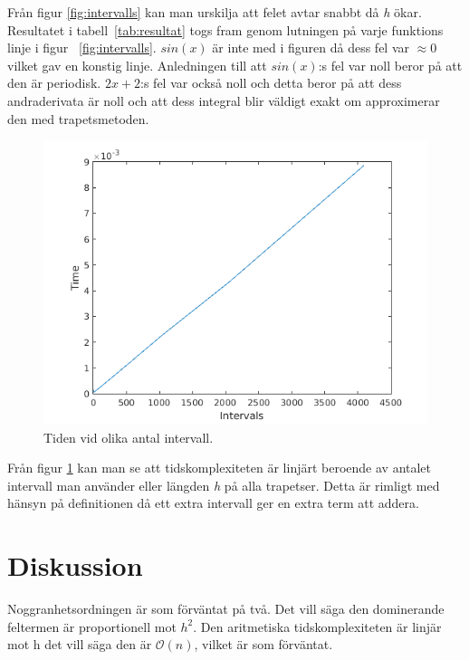 \documentclass[titlepage, a4paper]{article}
\begin{document}
Från figur \ref{fig:intervalls} kan man urskilja att felet avtar snabbt då \textit{h} ökar. Resultatet i tabell~\ref{tab:resultat} togs fram genom lutningen på varje funktions linje i figur ~\ref{fig:intervalls}. $sin(x)$ är inte med i figuren då dess fel var $\approx 0$ vilket gav en konstig linje. Anledningen till att $sin(x)$:s fel var noll beror på att den är periodisk. $2x+2$:s fel var också noll och detta beror på att dess andraderivata är noll och att dess integral blir väldigt exakt om approximerar den med trapetsmetoden. 

\begin{figure}[H]
  \centering
  \includegraphics[scale=0.6]{time.png}
  \caption{Tiden vid olika antal intervall.}
  \label{fig:time}
\end{figure}
Från figur \ref{fig:time} kan man se att tidskomplexiteten är linjärt beroende av antalet intervall man använder eller längden \textit{h} på alla trapetser. Detta är rimligt med hänsyn på definitionen då ett extra intervall ger en extra term att addera.


\section{Diskussion}
Noggranhetsordningen är som förväntat på två. Det vill säga den dominerande feltermen är proportionell mot $h^2$. Den aritmetiska tidskomplexiteten är linjär mot h det vill säga den är $\mathcal{O}(n)$, vilket är som förväntat.
\end{document}
